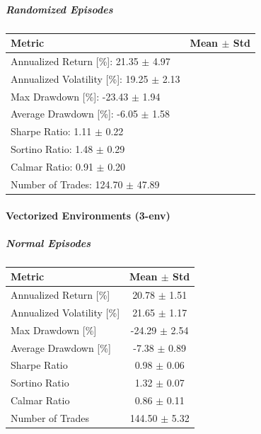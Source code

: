 \documentclass[12pt,a4paper]{report}
\begin{document}
\subparagraph{Randomized Episodes}

\begin{center}
\begin{tabular}{l c}
\toprule
\textbf{Metric} & \textbf{Mean $\pm$ Std} \\
\midrule
Annualized Return [\%]: 21.35 $\pm$ 4.97 \\
Annualized Volatility [\%]: 19.25 $\pm$ 2.13 \\
Max Drawdown [\%]: -23.43 $\pm$ 1.94 \\
Average Drawdown [\%]: -6.05 $\pm$ 1.58 \\
Sharpe Ratio: 1.11 $\pm$ 0.22 \\
Sortino Ratio: 1.48 $\pm$ 0.29 \\
Calmar Ratio: 0.91 $\pm$ 0.20 \\
Number of Trades: 124.70 $\pm$ 47.89 \\
\bottomrule
\end{tabular}
\label{tab:ppo-raw-1env-random}
\end{center}

\paragraph{Vectorized Environments (3-env)}
\subparagraph{Normal Episodes}

\begin{center}
\begin{tabular}{l c}
\toprule
\textbf{Metric} & \textbf{Mean $\pm$ Std} \\
\midrule
Annualized Return [\%]      & 20.78 $\pm$ 1.51 \\
Annualized Volatility [\%]  & 21.65 $\pm$ 1.17 \\
Max Drawdown [\%]           & -24.29 $\pm$ 2.54 \\
Average Drawdown [\%]       & -7.38 $\pm$ 0.89 \\
Sharpe Ratio                & 0.98 $\pm$ 0.06 \\
Sortino Ratio               & 1.32 $\pm$ 0.07 \\
Calmar Ratio                & 0.86 $\pm$ 0.11 \\
Number of Trades            & 144.50 $\pm$ 5.32 \\
\bottomrule
\end{tabular}
\label{tab:ppo-raw-3env-normal}
\end{center}
\end{document}
